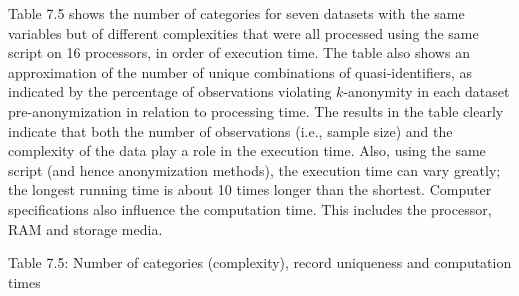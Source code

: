 \documentclass[letterpaper,10pt,english]{sphinxmanual}
\begin{document}
Table 7.5 shows the number of categories for seven datasets with the
same variables but of different complexities that were all processed
using the same script on 16 processors, in order of execution time. The
table also shows an approximation of the number of unique combinations
of quasi-identifiers, as indicated by the percentage of observations
violating \(k\)-anonymity in each dataset pre-anonymization in
relation to processing time. The results in the table clearly indicate
that both the number of observations (i.e., sample size) and the
complexity of the data play a role in the execution time. Also, using
the same script (and hence anonymization methods), the execution time
can vary greatly; the longest running time is about 10 times longer than
the shortest. Computer specifications also influence the computation
time. This includes the processor, RAM and storage media.

Table 7.5: Number of categories (complexity), record uniqueness and
computation times
\end{document}
